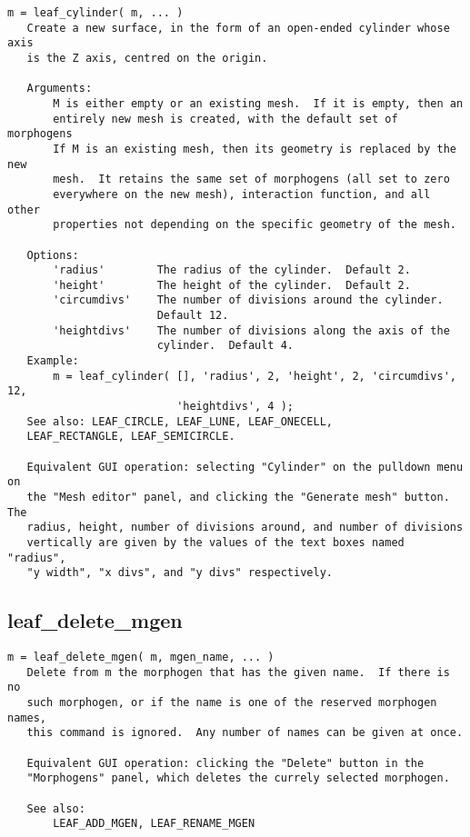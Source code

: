 \begin{verbatim}
m = leaf_cylinder( m, ... )
   Create a new surface, in the form of an open-ended cylinder whose axis
   is the Z axis, centred on the origin.

   Arguments:
       M is either empty or an existing mesh.  If it is empty, then an
       entirely new mesh is created, with the default set of morphogens
       If M is an existing mesh, then its geometry is replaced by the new
       mesh.  It retains the same set of morphogens (all set to zero
       everywhere on the new mesh), interaction function, and all other
       properties not depending on the specific geometry of the mesh.

   Options:
       'radius'        The radius of the cylinder.  Default 2.
       'height'        The height of the cylinder.  Default 2.
       'circumdivs'    The number of divisions around the cylinder.
                       Default 12.
       'heightdivs'    The number of divisions along the axis of the
                       cylinder.  Default 4.
   Example:
       m = leaf_cylinder( [], 'radius', 2, 'height', 2, 'circumdivs', 12,
                          'heightdivs', 4 );
   See also: LEAF_CIRCLE, LEAF_LUNE, LEAF_ONECELL,
   LEAF_RECTANGLE, LEAF_SEMICIRCLE.

   Equivalent GUI operation: selecting "Cylinder" on the pulldown menu on
   the "Mesh editor" panel, and clicking the "Generate mesh" button.  The
   radius, height, number of divisions around, and number of divisions
   vertically are given by the values of the text boxes named "radius",
   "y width", "x divs", and "y divs" respectively.
\end{verbatim}

\subsection{leaf\_delete\_mgen}\label{section-leaf-delete-mgen}

\begin{verbatim}
m = leaf_delete_mgen( m, mgen_name, ... )
   Delete from m the morphogen that has the given name.  If there is no
   such morphogen, or if the name is one of the reserved morphogen names,
   this command is ignored.  Any number of names can be given at once.

   Equivalent GUI operation: clicking the "Delete" button in the
   "Morphogens" panel, which deletes the currely selected morphogen.

   See also:
       LEAF_ADD_MGEN, LEAF_RENAME_MGEN
\end{verbatim}

